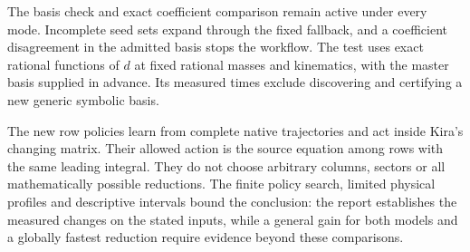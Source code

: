 The basis check and exact coefficient comparison remain active under every
mode. Incomplete seed sets expand through the fixed fallback, and a
coefficient disagreement in the admitted basis stops the workflow.
The test uses exact rational functions of $d$ at fixed rational masses and
kinematics, with the master basis supplied in advance. Its measured times
exclude discovering and certifying a new generic symbolic basis.

The new row policies learn from complete native trajectories and act inside
Kira's changing matrix. Their allowed action is the source equation among
rows with the same leading integral. They do not choose arbitrary columns,
sectors or all mathematically possible reductions. The finite policy search,
limited physical profiles and descriptive intervals bound the conclusion:
the report establishes the measured changes on the stated inputs, while
a general gain for both models and a globally fastest reduction require
evidence beyond these comparisons.
